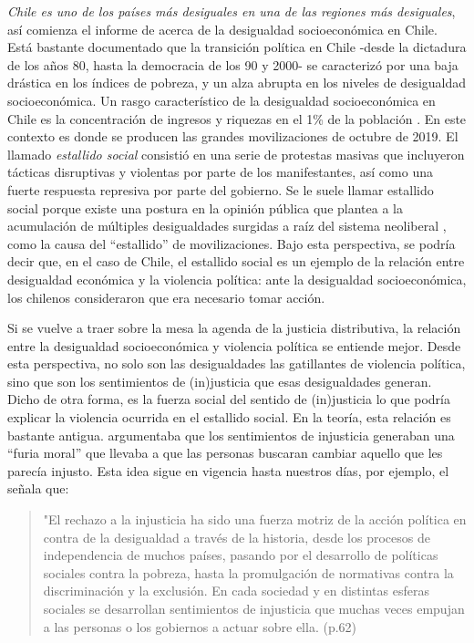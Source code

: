\documentclass[12pt,twoside]{templates/facsothesis}
\begin{document}
\emph{Chile es uno de los países más desiguales en una de las regiones más desiguales}, así comienza el informe de \citet{PNUD2017} acerca de la desigualdad socioeconómica en Chile. Está bastante documentado que la transición política en Chile -desde la dictadura de los años 80, hasta la democracia de los 90 y 2000- se caracterizó por una baja drástica en los índices de pobreza, y un alza abrupta en los niveles de desigualdad socioeconómica. Un rasgo característico de la desigualdad socioeconómica en Chile es la concentración de ingresos y riquezas en el 1\% de la población \citep{PNUD2017}. En este contexto es donde se producen las grandes movilizaciones de octubre de 2019. El llamado \emph{estallido social} consistió en una serie de protestas masivas que incluyeron tácticas disruptivas y violentas por parte de los manifestantes, así como una fuerte respuesta represiva por parte del gobierno. Se le suele llamar estallido social porque existe una postura en la opinión pública que plantea a la acumulación de múltiples desigualdades surgidas a raíz del sistema neoliberal \citep{Somma2020}, como la causa del ``estallido'' de movilizaciones. Bajo esta perspectiva, se podría decir que, en el caso de Chile, el estallido social es un ejemplo de la relación entre desigualdad económica y la violencia política: ante la desigualdad socioeconómica, los chilenos consideraron que era necesario tomar acción.

Si se vuelve a traer sobre la mesa la agenda de la justicia distributiva, la relación entre la desigualdad socioeconómica y violencia política se entiende mejor. Desde esta perspectiva, no solo son las desigualdades las gatillantes de violencia política, sino que son los sentimientos de (in)justicia que esas desigualdades generan. Dicho de otra forma, es la fuerza social del sentido de (in)justicia lo que podría explicar la violencia ocurrida en el estallido social. En la teoría, esta relación es bastante antigua. \citet{BarringtonMoore1978} argumentaba que los sentimientos de injusticia generaban una ``furia moral'' que llevaba a que las personas buscaran cambiar aquello que les parecía injusto. Esta idea sigue en vigencia hasta nuestros días, por ejemplo, el \citet{PNUD2017} señala que:

\begin{quote}
"El rechazo a la injusticia ha sido una fuerza motriz de la acción política en contra de la desigualdad a través de la historia, desde los procesos de independencia de muchos países, pasando por el desarrollo de políticas sociales contra la pobreza, hasta la promulgación de normativas contra la discriminación y la exclusión. En cada sociedad y en distintas esferas sociales se desarrollan sentimientos de injusticia que muchas veces empujan a las personas o los gobiernos a actuar sobre ella. (p.62)
\end{quote}
\end{document}
